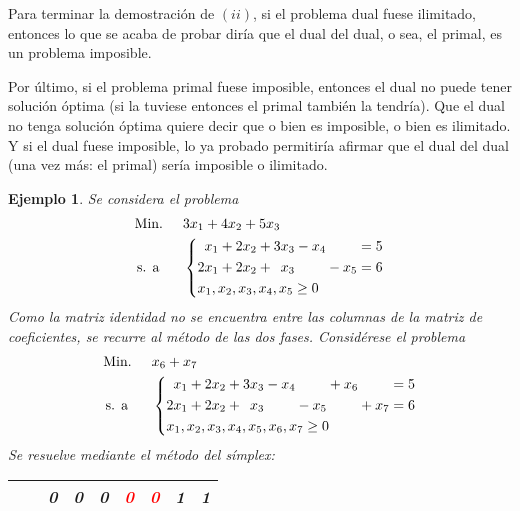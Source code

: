 \documentclass[11pt]{report}
\makeatletter
\renewenvironment{proof}[1][\proofname]{\par
  \pushQED{\qed}%
  \normalfont \topsep\z@skip %
  \trivlist
  \item[\hskip\labelsep
        \itshape
    #1\@addpunct{.}]\ignorespaces
}{%
  \popQED\endtrivlist\@endpefalse
}
\theoremstyle{mytheorem}
\theoremstyle{mydefinition}
\theoremstyle{myexample}
\newtheorem*{example}{Ejemplo}
\let\oldproofname=\proofname
\renewcommand{\proofname}{\rm\bf{\oldproofname}}}
\makeatother
\begin{document}
\begin{proof}
Para terminar la demostración de $(ii)$, si el problema dual fuese ilimitado, entonces lo que se acaba de probar diría que el dual del dual, o sea, el primal, es un problema imposible.



Por último, si el problema primal fuese imposible, entonces el dual no puede tener solución óptima (si la tuviese entonces el primal también la tendría). Que el dual no tenga solución óptima quiere decir que o bien es imposible, o bien es ilimitado. Y si el dual fuese imposible, lo ya probado permitiría afirmar que el dual del dual (una vez más: el primal) sería imposible o ilimitado.
\end{proof}

\begin{example}
Se considera el problema
\[\begin{aligned}[t]
&\text{Min. } && 3x_1+4x_2+5x_3 \\
& \, \text{s. a} &&\left\{\begin{alignedat}{10}
&  &x_1 & {}+{} & 2&x_2 & {}+{} & 3&x_3 & {}-{} & x_4 &       &     & = 5 \\
& 2&x_1 & {}+{} & 2&x_2 & {}+{} &  &x_3 &       &     & {}-{} & x_5 & = 6 \\
&\mathrlap{x_1,x_2,x_3,x_4,x_5 \geq 0}
\end{alignedat}\right.
\end{aligned}\] 
Como la matriz identidad no se encuentra entre las columnas de la matriz de coeficientes, se recurre al método de las dos fases. Considérese el problema
\[\begin{aligned}[t]
&\text{Min. } && x_6+x_7 \\
& \, \text{s. a} &&\left\{\begin{alignedat}{10}
&  &x_1 & {}+{} & 2&x_2 & {}+{} & 3&x_3 & {}-{} & x_4 &       &     & {}+{} & x_6 &       &     & = 5 \\
& 2&x_1 & {}+{} & 2&x_2 & {}+{} &  &x_3 &       &     & {}-{} & x_5 &       &     & {}+{} & x_7 & = 6 \\
&\mathrlap{x_1,x_2,x_3,x_4,x_5,x_6,x_7 \geq 0}
\end{alignedat}\right.
\end{aligned}\] 
Se resuelve mediante el método del símplex:
\begin{center}
\begin{tabular}{|c|c|c|c|c|c|c|c|c|}
    \cline{3-9}
    
    \multicolumn{1}{c}{} & \multicolumn{1}{c|}{} & \multicolumn{1}{c}{\phantom{-}0} & \multicolumn{1}{c}{\phantom{-}0} & \multicolumn{1}{c}{\phantom{-}0} & \multicolumn{1}{c}{\phantom{-}\textcolor{Red}{0}} & \multicolumn{1}{c}{\phantom{-}\textcolor{Red}{0}} & \multicolumn{1}{c}{\phantom{-}1} & \multicolumn{1}{c|}{\phantom{-}1} \\ \hline
    

\end{tabular}
\end{center}
\end{example}
\end{document}
